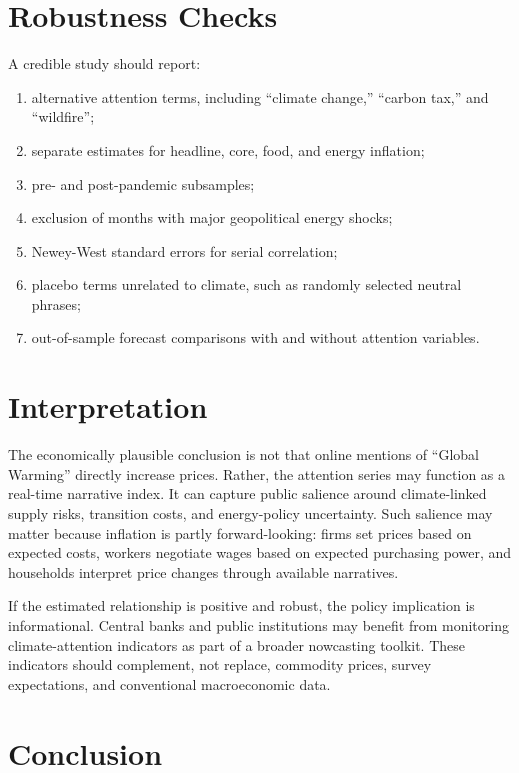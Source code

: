 \documentclass[12pt]{article}
\begin{document}
\section{Robustness Checks}

A credible study should report:

\begin{enumerate}
    \item alternative attention terms, including ``climate change,'' ``carbon tax,'' and ``wildfire'';
    \item separate estimates for headline, core, food, and energy inflation;
    \item pre- and post-pandemic subsamples;
    \item exclusion of months with major geopolitical energy shocks;
    \item Newey-West standard errors for serial correlation;
    \item placebo terms unrelated to climate, such as randomly selected neutral phrases;
    \item out-of-sample forecast comparisons with and without attention variables.
\end{enumerate}

\section{Interpretation}

The economically plausible conclusion is not that online mentions of ``Global Warming'' directly increase prices. Rather, the attention series may function as a real-time narrative index. It can capture public salience around climate-linked supply risks, transition costs, and energy-policy uncertainty. Such salience may matter because inflation is partly forward-looking: firms set prices based on expected costs, workers negotiate wages based on expected purchasing power, and households interpret price changes through available narratives.

If the estimated relationship is positive and robust, the policy implication is informational. Central banks and public institutions may benefit from monitoring climate-attention indicators as part of a broader nowcasting toolkit. These indicators should complement, not replace, commodity prices, survey expectations, and conventional macroeconomic data.

\section{Conclusion}
\end{document}
